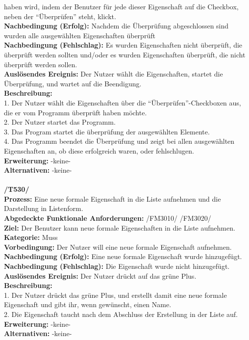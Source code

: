 \documentclass[a4paper]{scrreprt}
\begin{document}
haben wird, indem der Benutzer für jede dieser Eigenschaft auf die Checkbox,
neben der "`Überprüfen"' steht, klickt.\\
\textbf{Nachbedingung (Erfolg):} Nachdem die Überprüfung abgeschlossen sind
wurden alle ausgewählten Eigenschaften überprüft\\
\textbf{Nachbedingung (Fehlschlag):} Es wurden Eigenschaften nicht überprüft,
die überprüft werden sollten und/oder es wurden Eigenschaften überprüft, die
nicht überprüft werden sollen.\\
\textbf{Auslösendes Ereignis:} Der Nutzer wählt die Eigenschaften, startet die
Überprüfung, und wartet auf die Beendigung.	\\
\textbf{Beschreibung:} \\
1. Der Nutzer wählt die Eigenschaften über die "`Überprüfen"'-Checkboxen aus,
die er vom Programm überprüft haben möchte.\\
2. Der Nutzer startet das Programm.\\
3. Das Program startet die überprüfung der ausgewählten Elemente.\\
4. Das Programm beendet die Überprüfung und zeigt bei allen ausgewählten
Eigenschaften an, ob diese erfolgreich waren, oder fehlschlugen.\\
\textbf {Erweiterung:}  -keine- \\
\textbf {Alternativen:} -keine- \\ \\
\textbf{/T530/}\\
\textbf{Prozess: }Eine neue formale Eigenschaft in die Liste aufnehmen
und die Darstellung in Listenform. \\
\textbf{Abgedeckte Funktionale Anforderungen:} /FM3010/ /FM3020/ \\
\textbf{Ziel:} Der Benutzer kann neue formale Eigenschaften in die Liste
aufnehmen. \\
\textbf{Kategorie:} Muss\\
\textbf{Vorbedingung:} Der Nutzer will eine neue formale Eigenschaft
aufnehmen.\\
\textbf{Nachbedingung (Erfolg):} Eine neue formale Eigenschaft wurde
hinzugefügt.\\
\textbf{Nachbedingung (Fehlschlag):} Die Eigenschaft wurde nicht hinzugefügt.\\
\textbf{Auslösendes Ereignis:} Der Nutzer drückt auf das grüne Plus.\\
\textbf{Beschreibung:} \\
1. Der Nutzer drückt das grüne Plus, und erstellt damit eine neue formale
Eigenschaft und gibt ihr, wenn gewünscht, einen Name.\\
2. Die Eigenschaft taucht nach dem Abschluss der Erstellung in der Liste auf.\\
\textbf {Erweiterung:}  -keine- \\
\textbf {Alternativen:} -keine- \\ \\
\end{document}
